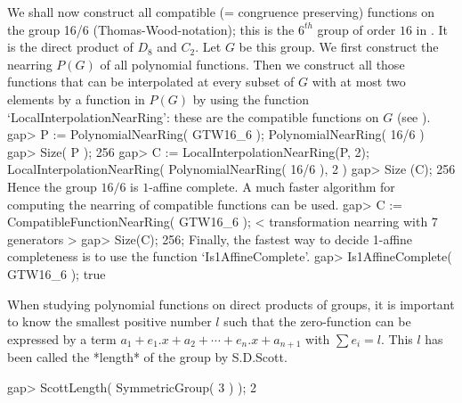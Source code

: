 We shall now construct all compatible (= congruence preserving) functions
on the group 16/6 (Thomas-Wood-notation); this is the $6^{th}$ group
of order $16$ in \cite{thomaswood80:GT}.
It is the direct
product of $D_8$ and $C_2$. Let $G$ be this group. We first
construct the nearring $P(G)$ of all polynomial functions.
Then we construct all those functions that can be interpolated
at every subset of $G$ with at most two elements by a function in
$P(G)$ by using the function `LocalInterpolationNearRing': 
these are the compatible functions on $G$ (see \cite{Pilz:Nearrings}). 
\beginexample  
    gap> P := PolynomialNearRing( GTW16_6 );
    PolynomialNearRing( 16/6 )
    gap> Size( P );
    256
    gap> C := LocalInterpolationNearRing(P, 2);
    LocalInterpolationNearRing( PolynomialNearRing( 16/6 ), 2 )
    gap> Size (C);
    256
\endexample
Hence the group $16/6$ is $1$-affine complete. A much faster algorithm for
computing the nearring of compatible functions can be used.
\beginexample
    gap> C := CompatibleFunctionNearRing( GTW16_6 );
    < transformation nearring with 7 generators >
    gap> Size(C);
    256;
\endexample
Finally, the fastest way to decide 1-affine completeness is to use the function 
`Is1AffineComplete'.
\beginexample
    gap> Is1AffineComplete( GTW16_6 );
    true
\endexample

When studying polynomial functions on direct products of groups, it is
important to know the smallest positive number $l$ such
that the zero-function can be expressed by a term
$a_1 + e_1.x + a_2 + \cdots + e_n.x + a_{n+1}$ with
$\sum e_i = l$. 
This $l$ has been called the *length* of the group
by S.D.Scott.

\beginexample
    gap> ScottLength( SymmetricGroup( 3 ) );
    2
\endexample




